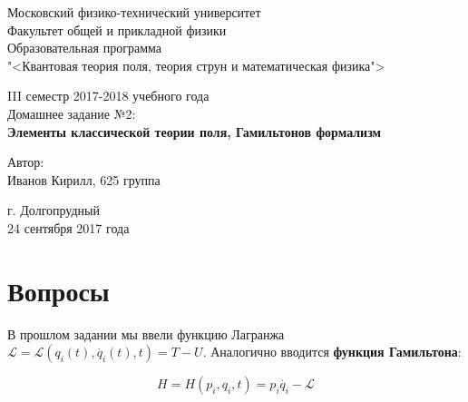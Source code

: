 \documentclass[12pt]{kiarticle}
\newcommand{\Ll}{\ensuremath{\mathcal{L}}}
\begin{document}
	
	\begin{titlepage}		
		\begin{center}
			\large 	Московский физико-технический университет \\
			Факультет общей и прикладной физики \\
			\vspace{0.2cm}
			Образовательная программа\\
			"<Квантовая теория поля, теория струн и математическая физика">
			
			\vspace{4.5cm}
			III семестр 2017-2018 учебного года \\ \vspace{0.1cm}
			\large Домашнее задание №2: \\ \vspace{0.1cm}
			\LARGE \textbf{Элементы классической теории поля, Гамильтонов формализм}
		\end{center}
		\vspace{2.3cm} \large
		
		\begin{center}
			Автор: \\
			Иванов Кирилл,
			625 группа
			\vspace{10mm}
			
			
		\end{center}
		
		\begin{center} \vspace{50mm}
			г. Долгопрудный \\ 
			24 сентября 2017 года
		\end{center}
	\end{titlepage}
	
	
	
	
	\section{Вопросы}
	
	В прошлом задании мы ввели функцию Лагранжа $ \Ll = \Ll \left( q_i(t), \dot{q_i}(t), t\right) = T - U $. Аналогично вводится \textbf{функция Гамильтона}:
	
	\begin{equation}\label{}
	H = H (p_i, q_i, t) = p_i\dot{q_i} - \Ll 
	\end{equation}
	
\end{document}
